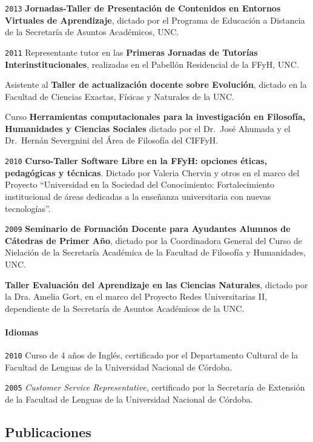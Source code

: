 \documentclass[]{article}
\let\oldparagraph\paragraph
\renewcommand{\paragraph}[1]{\oldparagraph{#1}\mbox{}}
\begin{document}
\texttt{2013} \textbf{Jornadas-Taller de Presentación de Contenidos en
Entornos Virtuales de Aprendizaje}, dictado por el Programa de Educación
a Distancia de la Secretaría de Asuntos Académicos, UNC.

\texttt{2011} Representante tutor en las \textbf{Primeras Jornadas de
Tutorías Interinstitucionales}, realizadas en el Pabellón Residencial de
la FFyH, UNC.

Asistente al \textbf{Taller de actualización docente sobre Evolución},
dictado en la Facultad de Ciencias Exactas, Físicas y Naturales de la
UNC.

Curso \textbf{Herramientas computacionales para la investigación en
Filosofía, Humanidades y Ciencias Sociales} dictado por el Dr.~José
Ahumada y el Dr.~Hernán Severgnini del Área de Filosofía del CIFFyH.

\texttt{2010} \textbf{Curso-Taller Software Libre en la FFyH: opciones
éticas, pedagógicas y técnicas}. Dictado por Valeria Chervin y otros en
el marco del Proyecto ``Universidad en la Sociedad del Conocimiento:
Fortalecimiento institucional de áreas dedicadas a la enseñanza
universitaria con nuevas tecnologías''.

\texttt{2009} \textbf{Seminario de Formación Docente para Ayudantes
Alumnos de Cátedras de Primer Año}, dictado por la Coordinadora General
del Curso de Nielación de la Secretaría Académica de la Facultad de
Filosofía y Humanidades, UNC.

\textbf{Taller Evaluación del Aprendizaje en las Ciencias Naturales},
dictado por la Dra. Amelia Gort, en el marco del Proyecto Redes
Universitarias II, dependiente de la Secretaría de Asuntos Académicos de
la UNC.

\hypertarget{idiomas}{%
\paragraph{Idiomas}\label{idiomas}}

\texttt{2010} Curso de 4 años de Inglés, certificado por el Departamento
Cultural de la Facultad de Lenguas de la Universidad Nacional de
Córdoba.

\texttt{2005} \emph{Customer Service Representative}, certificado por la
Secretaria de Extensión de la Facultad de Lenguas de la Universidad
Nacional de Córdoba.

\hypertarget{publicaciones}{%
\subsection{Publicaciones}\label{publicaciones}}
\end{document}
